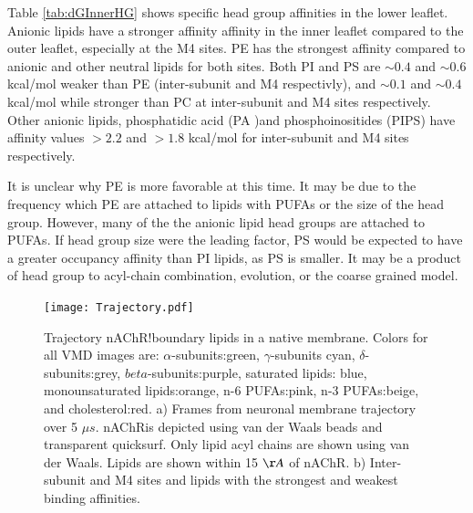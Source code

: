 \documentclass[preprint,3p,9pt,times,onecolumn]{elsarticle}
\newcommand{\nachr}{nAChR}
\begin{document}
Table \ref{tab:dGInnerHG} shows specific head group affinities in the lower leaflet. Anionic lipids have a stronger affinity affinity in the inner leaflet compared to the outer leaflet, especially at the M4 sites. PE has the strongest affinity compared to anionic and other neutral lipids for both sites. Both PI and PS are $\sim 0.4 $ and $\sim 0.6$ kcal/mol weaker than PE (inter-subunit and M4 respectivly), and $\sim 0.1$ and $\sim0.4$kcal/mol while stronger than PC at inter-subunit and M4 sites respectively. Other anionic lipids, phosphatidic acid  (PA )and phosphoinositides (PIPS) have affinity values $>2.2$ and $>1.8$ kcal/mol for inter-subunit and M4 sites respectively.


It is unclear why PE is more favorable at this time. It may be due to the frequency which PE are attached to lipids with PUFAs or the size of the head group.  However, many of the the anionic lipid head groups are attached to PUFAs. If head group size were the leading factor, PS would be expected to have a greater occupancy affinity than PI lipids, as PS is smaller. It may be a product of head group to acyl-chain combination, evolution, or the coarse grained model. %

 \begin{figure}
	\center
	\texttt{[image: Trajectory.pdf]}

	\caption{Trajectory \nachr!boundary lipids in a native membrane. Colors for all VMD images are: $\alpha$-subunits:green, $\gamma$-subunits cyan, $\delta$-subunits:grey, $beta$-subunits:purple, saturated lipids: blue, monounsaturated lipids:orange, n-6 PUFAs:pink, n-3 PUFAs:beige, and cholesterol:red. a) Frames from neuronal membrane trajectory over 5 $\mu s$. \nachr is depicted using van der Waals beads and transparent quicksurf. Only lipid acyl chains are shown using van der Waals. Lipids are shown within 15 $\AA$ of \nachr. b) Inter-subunit and M4 sites and lipids with the strongest and weakest binding affinities. }
	\label{fig:trj}
\end{figure}
\end{document}
